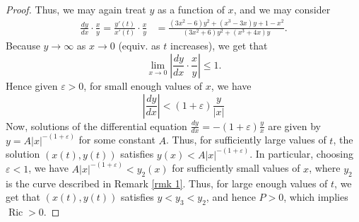 \documentclass{amsart}
\let\epsilon\varepsilon
\numberwithin{equation}{section}
\theoremstyle{plain}
\theoremstyle{definition}
\theoremstyle{remark}
\numberwithin{table}{section}
\DeclareMathOperator{\Ric}{Ric}
\begin{document}
\begin{proof}
%
Thus, we may again treat $y$ as a function of $x$, and we may consider
    \begin{align*}
        \frac{dy}{dx}\cdot \frac{x}{y} 
        = \frac{y'(t)}{x'(t)}\cdot \frac{x}{y} 
        &= \frac{ (3x^2-6)y^2 + (x^3 - 3x)y + 1 - x^2}{ (3x^2+6)y^2 + (x^3  + 4x)y }.
    \end{align*}
    Because $y\to\infty$ as $x\to 0$ (equiv. as $t$ increases), we get that
    \[
        \lim_{x \to 0} \left|\frac{dy}{dx}\cdot \frac{x}{y}\right| \leq  1.
    \]
    Hence given $\epsilon>0$, for small enough values of $x$, we have
    \[
        \left|\frac{dy}{dx}\right| < (1+\epsilon)\frac{y}{|x|}
    \]
    Now, solutions of the differential equation $\frac{dy}{dx} = -(1+\epsilon)\frac{y}{x}$ are given by $y = A|x|^{-(1+\epsilon)}$ for some constant $A$.
    Thus, for sufficiently large values of $t$, the solution $(x(t),y(t))$ satisfies $y(x) < A|x|^{-(1+\epsilon)}$.
    In particular, choosing $\epsilon <1$, we have $A|x|^{-(1+\epsilon)}<y_2(x)$ for sufficiently small values of $x$, where $y_2$ is the curve described in Remark \ref{rmk 1}.
    Thus, for large enough values of $t$, we get that $(x(t),y(t))$ satisfies $y<y_3<y_2$, and hence $P>0$, which implies $\Ric>0$.
%

\end{proof}
\end{document}
